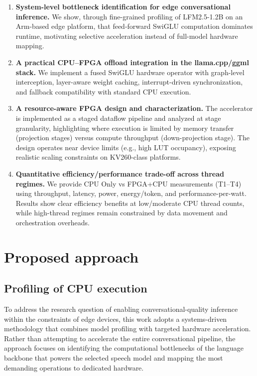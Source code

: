 \documentclass[conference]{IEEEtran}
\begin{document}
\begin{enumerate}
    \item \textbf{System-level bottleneck identification for edge conversational inference.}
    We show, through fine-grained profiling of LFM2.5-1.2B on an Arm-based edge platform, that feed-forward SwiGLU computation dominates runtime, motivating selective acceleration instead of full-model hardware mapping.

    \item \textbf{A practical CPU--FPGA offload integration in the llama.cpp/ggml stack.}
    We implement a fused SwiGLU hardware operator with graph-level interception, layer-aware weight caching, interrupt-driven synchronization, and fallback compatibility with standard CPU execution.

    \item \textbf{A resource-aware FPGA design and characterization.}
    The accelerator is implemented as a staged dataflow pipeline and analyzed at stage granularity, highlighting where execution is limited by memory transfer (projection stages) versus compute throughput (down-projection stage). The design operates near device limits (e.g., high LUT occupancy), exposing realistic scaling constraints on KV260-class platforms.

    \item \textbf{Quantitative efficiency/performance trade-off across thread regimes.}
    We provide CPU Only vs FPGA+CPU measurements (T1--T4) using throughput, latency, power, energy/token, and performance-per-watt. Results show clear efficiency benefits at low/moderate CPU thread counts, while high-thread regimes remain constrained by data movement and orchestration overheads.
\end{enumerate}

\section{Proposed approach} \label{sec:approach}
\subsection{Profiling of CPU execution} \label{subsec:cpuexec}
To address the research question of enabling conversational-quality inference within the constraints of edge devices, this work adopts a systems-driven methodology that combines model profiling with targeted hardware acceleration. Rather than attempting to accelerate the entire conversational pipeline, the approach focuses on identifying the computational bottlenecks of the language backbone that powers the selected speech model and mapping the most demanding operations to dedicated hardware.
\end{document}
